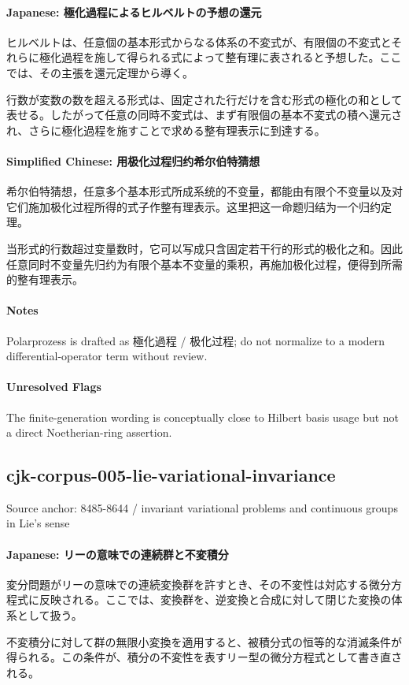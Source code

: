 \documentclass[11pt]{article}
\begin{document}
\paragraph{Japanese: 極化過程によるヒルベルトの予想の還元}
ヒルベルトは、任意個の基本形式からなる体系の不変式が、有限個の不変式とそれらに極化過程を施して得られる式によって整有理に表されると予想した。ここでは、その主張を還元定理から導く。\par
行数が変数の数を超える形式は、固定された行だけを含む形式の極化の和として表せる。したがって任意の同時不変式は、まず有限個の基本不変式の積へ還元され、さらに極化過程を施すことで求める整有理表示に到達する。\par
\paragraph{Simplified Chinese: 用极化过程归约希尔伯特猜想}
希尔伯特猜想，任意多个基本形式所成系统的不变量，都能由有限个不变量以及对它们施加极化过程所得的式子作整有理表示。这里把这一命题归结为一个归约定理。\par
当形式的行数超过变量数时，它可以写成只含固定若干行的形式的极化之和。因此任意同时不变量先归约为有限个基本不变量的乘积，再施加极化过程，便得到所需的整有理表示。\par
\paragraph{Notes}
Polarprozess is drafted as 極化過程 / 极化过程; do not normalize to a modern differential-operator term without review.\par
\paragraph{Unresolved Flags}
The finite-generation wording is conceptually close to Hilbert basis usage but not a direct Noetherian-ring assertion.\par
\subsection*{cjk-corpus-005-lie-variational-invariance}
Source anchor: 8485-8644 / invariant variational problems and continuous groups in Lie's sense
\par
\paragraph{Japanese: リーの意味での連続群と不変積分}
変分問題がリーの意味での連続変換群を許すとき、その不変性は対応する微分方程式に反映される。ここでは、変換群を、逆変換と合成に対して閉じた変換の体系として扱う。\par
不変積分に対して群の無限小変換を適用すると、被積分式の恒等的な消滅条件が得られる。この条件が、積分の不変性を表すリー型の微分方程式として書き直される。\par
\end{document}

